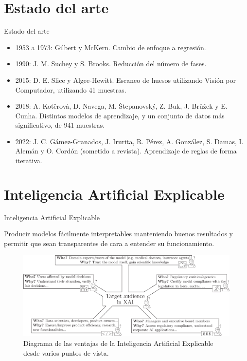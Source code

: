 \documentclass{beamer}
\begin{document}
\section{Estado del arte}
\begin{frame}[allowframebreaks]{Estado del arte}

\begin{itemize}
\item 1953 a 1973: Gilbert y McKern. Cambio de enfoque a regresión.

\item 1990: J. M. Suchey y S. Brooks. Reducción del número de fases.

\item 2015: D. E. Slice y Algee-Hewitt. Escaneo de huesos utilizando Visión por Computador, utilizando 41 muestras.

\item 2018: A. Kotěrová, D. Navega, M. Štepanovský, Z. Buk, J. Brůžek y E. Cunha. Distintos modelos de aprendizaje, y un conjunto de datos más significativo, de 941 muestras.

\item 2022: J. C. Gámez-Granados, J. Irurita, R. Pérez, A. González, S. Damas, I. Alemán y O. Cordón (sometido a revista). Aprendizaje de reglas de forma iterativa.

\end{itemize}

\end{frame}


\section{Inteligencia Artificial Explicable}
\begin{frame}{Inteligencia Artificial Explicable}

	Producir modelos fácilmente interpretables manteniendo buenos resultados y permitir que sean transparentes de cara a entender su funcionamiento.

	\begin{figure}[H]
		\centering
		\includegraphics[scale = 0.65]{esquema_xai.png}
		\caption{Diagrama de las ventajas de la Inteligencia Artificial Explicable desde varios puntos de vista.}
		\label{fig:esquema_xai}
	\end{figure}

\end{frame}
\end{document}
